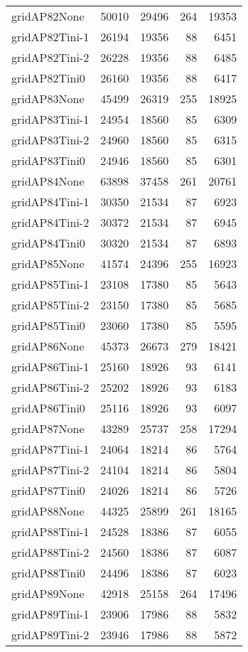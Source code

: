 \begin{longtable}{lrrrr}
gridAP82None & 50010 & 29496 & 264 & 19353 \\
gridAP82Tini-1 & 26194 & 19356 & 88 & 6451 \\
gridAP82Tini-2 & 26228 & 19356 & 88 & 6485 \\
gridAP82Tini0 & 26160 & 19356 & 88 & 6417 \\
gridAP83None & 45499 & 26319 & 255 & 18925 \\
gridAP83Tini-1 & 24954 & 18560 & 85 & 6309 \\
gridAP83Tini-2 & 24960 & 18560 & 85 & 6315 \\
gridAP83Tini0 & 24946 & 18560 & 85 & 6301 \\
gridAP84None & 63898 & 37458 & 261 & 20761 \\
gridAP84Tini-1 & 30350 & 21534 & 87 & 6923 \\
gridAP84Tini-2 & 30372 & 21534 & 87 & 6945 \\
gridAP84Tini0 & 30320 & 21534 & 87 & 6893 \\
gridAP85None & 41574 & 24396 & 255 & 16923 \\
gridAP85Tini-1 & 23108 & 17380 & 85 & 5643 \\
gridAP85Tini-2 & 23150 & 17380 & 85 & 5685 \\
gridAP85Tini0 & 23060 & 17380 & 85 & 5595 \\
gridAP86None & 45373 & 26673 & 279 & 18421 \\
gridAP86Tini-1 & 25160 & 18926 & 93 & 6141 \\
gridAP86Tini-2 & 25202 & 18926 & 93 & 6183 \\
gridAP86Tini0 & 25116 & 18926 & 93 & 6097 \\
gridAP87None & 43289 & 25737 & 258 & 17294 \\
gridAP87Tini-1 & 24064 & 18214 & 86 & 5764 \\
gridAP87Tini-2 & 24104 & 18214 & 86 & 5804 \\
gridAP87Tini0 & 24026 & 18214 & 86 & 5726 \\
gridAP88None & 44325 & 25899 & 261 & 18165 \\
gridAP88Tini-1 & 24528 & 18386 & 87 & 6055 \\
gridAP88Tini-2 & 24560 & 18386 & 87 & 6087 \\
gridAP88Tini0 & 24496 & 18386 & 87 & 6023 \\
gridAP89None & 42918 & 25158 & 264 & 17496 \\
gridAP89Tini-1 & 23906 & 17986 & 88 & 5832 \\
gridAP89Tini-2 & 23946 & 17986 & 88 & 5872 \\

\end{longtable}
